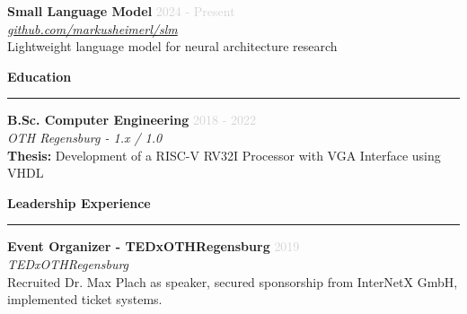 \documentclass[a4paper,10pt]{article}
\newcommand{\cvsection}[1]{
    \vspace{12pt}
    {\large\bfseries\color{darkgray} #1}
    \vspace{4pt}
    \hrule
    \vspace{8pt}
}
\newcommand{\cventry}[4]{
    \vspace{3pt}
    \textbf{\color{darkgray}#1} \hfill \textcolor{lightgray}{\small #2} \\
    \textcolor{primaryblue}{\textit{\small #3}} \\
    \vspace{3pt}
    {\small #4}
    \vspace{8pt}
}
\begin{document}
\begin{paracol}{2}
\cventry{Small Language Model}{2024 - Present}{\href{https://github.com/markusheimerl/slm}{github.com/markusheimerl/slm}}{
    Lightweight language model for neural architecture research
}

\cvsection{Education}

\cventry{B.Sc. Computer Engineering}{2018 - 2022}{OTH Regensburg - 1.x / 1.0}{
    \textbf{Thesis:} Development of a RISC-V RV32I Processor with VGA Interface using VHDL
}

\cvsection{Leadership Experience}

\textbf{Event Organizer - TEDxOTHRegensburg} \hfill \textcolor{lightgray}{\small 2019} \\
\textcolor{primaryblue}{\textit{\small TEDxOTHRegensburg}} \\
\vspace{3pt}
{\small Recruited Dr. Max Plach as speaker, secured sponsorship from InterNetX GmbH, implemented ticket systems.}

\vspace{0.5cm}

\end{paracol}
\end{document}

